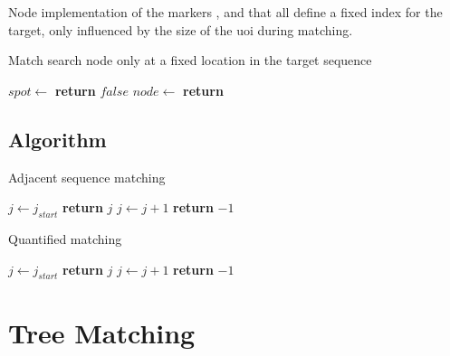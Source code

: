 \documentclass[11pt,a4paper]{report}
\begin{document}
Node implementation of the markers ,  and  that all define a fixed index for the target, only influenced by the size of the \ac{uoi} during matching.

\begin{algorithm}[H]
	\caption[Fixed spot matching]{Match search node only at a fixed location in the target sequence}
	\label{alg:match-spot}
	\begin{algorithmic}[1]
		\State $spot \gets$ 
			\State \textbf{return} $false$
		\EndIf
		\State $node \gets$ 
		\State \textbf{return} 
		\EndProcedure
	\end{algorithmic}
\end{algorithm}

\section{Algorithm}
\label{sec:seq-alg}

\begin{algorithm}[H]
	\caption{Adjacent sequence matching}
	\label{alg:match-adjacent}
	\begin{algorithmic}[1]
		 
		\State $j \gets j_{start}$
		\State \textbf{return} $j$
		\EndIf
		\State $j \gets j + 1$
		\EndWhile
		\State \textbf{return} $-1$
		\EndProcedure
	\end{algorithmic}
\end{algorithm}

\begin{algorithm}[H]
	\caption{Quantified matching}
	\label{alg:match-quantified}
	\begin{algorithmic}[1]
		 
		\State $j \gets j_{start}$
		\State \textbf{return} $j$
		\EndIf
		\State $j \gets j + 1$
		\EndWhile
		\State \textbf{return} $-1$
		\EndProcedure
	\end{algorithmic}
\end{algorithm}



\chapter{Tree Matching}
\label{chap:tree-matching}
\end{document}
